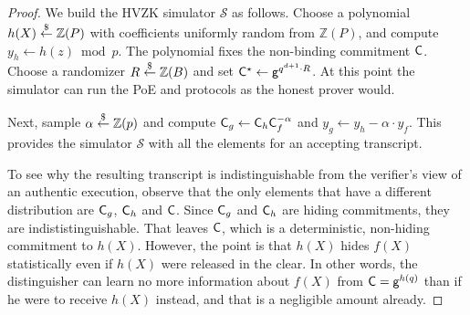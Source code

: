 \begin{proof}
We build the HVZK simulator $\mathcal{S}$ as follows. Choose a polynomial $h(X) \overset{\$}{\gets} \mathbb{Z}(P)$ with coefficients uniformly random from $\mathbb{Z}(P)$, and compute $y_h \gets h(z) \bmod p$. The polynomial fixes the non-binding commitment $\mathsf{C}$. Choose a randomizer $R \overset{\$}{\gets} \mathbb{Z}(B)$ and set $\mathsf{C}^\star \gets \mathsf{g}^{q^{d+1} \cdot R}$. At this point the simulator can run the \textsf{PoE} and \eval protocols as the honest prover would.

Next, sample $\alpha \overset{\$}{\gets} \mathbb{Z}(p)$ and compute $\mathsf{C}_g \gets \mathsf{C}_h \mathsf{C}_f^{-\alpha}$ and $y_g \gets y_h - \alpha \cdot y_f$. This provides the simulator $\mathcal{S}$ with all the elements for an accepting transcript.

To see why the resulting transcript is indistinguishable from the verifier's view of an authentic execution, observe that the only elements that have a different distribution are $\mathsf{C}_g$, $\mathsf{C}_h$ and $\mathsf{C}$. Since $\mathsf{C}_g$ and $\mathsf{C}_h$ are hiding commitments, they are indististinguishable. That leaves $\mathsf{C}$, which is a deterministic, non-hiding commitment to $h(X)$. However, the point is that $h(X)$ hides $f(X)$ statistically even if $h(X)$ were released in the clear. In other words, the distinguisher can learn no more information about $f(X)$ from $\mathsf{C} = \mathsf{g}^{h(q)}$ than if he were to receive $h(X)$ instead, and that is a negligible amount already.
\end{proof}